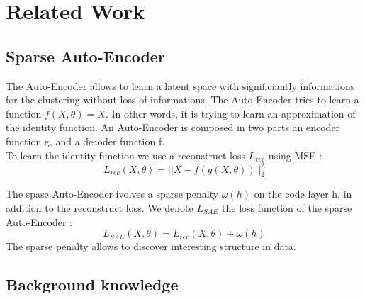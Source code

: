 \section{Related Work}\label{sec:related}

\subsection{Sparse Auto-Encoder}
The Auto-Encoder allows to learn a latent space with significiantly informations
for the clustering without loss of informations. The Auto-Encoder tries to learn
a function $f(X, \theta) = X$. In other words, it is trying to learn an
approximation of the identity function. An Auto-Encoder is composed in two
parts an encoder function g, and a decoder function f.\\
To learn the identity function we use a reconstruct loss $L_{rec}$ using MSE :
\begin{equation*}
  L_{rec}(X, \theta) = || X - f(g(X, \theta)) ||_2^2 
\end{equation*}

The spase Auto-Encoder ivolves a sparse penalty $\omega(h)$ on the code layer h,
in addition to the reconstruct loss. We  denote $L_{SAE}$ the loss function of
the sparse Auto-Encoder :
\begin{equation*}
  L_{SAE}(X, \theta) = L_{rec}(X, \theta) + \omega(h)
\end{equation*}
The sparse penalty allows to discover interesting structure in data.

\subsection{Background knowledge}

